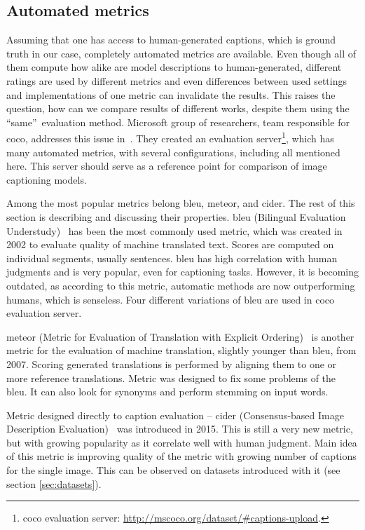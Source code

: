 \subsection{Automated metrics}

Assuming that one has access to human-generated captions, which is ground truth in our case, completely automated metrics are available. Even though all of them compute how alike are model descriptions to human-generated, different ratings are used by different metrics and even differences between used settings and implementations of one metric can invalidate the results. This raises the question, how can we compare results of different works, despite them using the \textquotedblleft same\textquotedblright\ evaluation method. Microsoft group of researchers, team responsible for \gls{coco}, addresses this issue in~\cite{DBLP:journals/corr/ChenFLVGDZ15}. They created an evaluation server\footnote{\gls{coco} evaluation server: \url{http://mscoco.org/dataset/\#captions-upload}.}, which has many automated metrics, with several configurations, including all mentioned here. This server should serve as a reference point for comparison of image captioning models.

Among the most popular metrics belong \gls{bleu}, \gls{meteor}, and \gls{cider}. The rest of this section is describing and discussing their properties. \gls{bleu} (Bilingual Evaluation Understudy)~\cite{Papineni:2002:BMA:1073083.1073135} has been the most commonly used metric, which was created in 2002 to evaluate quality of machine translated text. Scores are computed on individual segments, usually sentences. \gls{bleu} has high correlation with human judgments and is very popular, even for captioning tasks. However, it is becoming outdated, as according to this metric, automatic methods are now outperforming humans, which is senseless. Four different variations of \gls{bleu} are used in \gls{coco} evaluation server.

\gls{meteor} (Metric for Evaluation of Translation with Explicit Ordering)~\cite{Lavie:2007:MAM:1626355.1626389} is another metric for the evaluation of machine translation, slightly younger than \gls{bleu}, from 2007. Scoring generated translations is performed by aligning them to one or more reference translations. Metric was designed to fix some problems of the \gls{bleu}. It can also look for synonyms and perform stemming on input words.

Metric designed directly to caption evaluation -- \gls{cider} (Consensus-based Image Description Evaluation)~\cite{Vedantam_2015_CVPR} was introduced in 2015. This is still a very new metric, but with growing popularity as it correlate well with human judgment. Main idea of this metric is improving quality of the metric with growing number of captions for the single image. This can be observed on datasets introduced with it (see section \ref{sec:datasets}).


